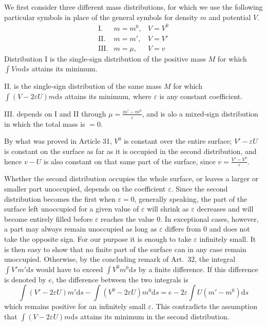 We first consider three different mass distributions, for which we use the following particular symbols in place of the general symbols for density $m$ and potential $V$.
\[
\begin{array}{rll}
\mathrm{I.}&m=m^0,&V=V^0\\
\mathrm{II.}&m=m',&V=V'\\
\mathrm{III.}&m=\mu,&V=v
\end{array}
\]
Distribution I is the single-sign distribution of the positive mass $M$ for which $\int Vm\mathrm ds$ attains its minimum.

II. is the single-sign distribution of the same mass $M$ for which $\int(V-2\varepsilon U)m\mathrm ds$ attains its minimum, where $\varepsilon$ is any constant coefficient.

III. depends on I and II through $\mu=\frac{m'-m^0}{\varepsilon}$, and is alo a mixed-sign distribution in which the total mass is $=0$.

By what was proved in Article 31, $V^0$ is constant over the entire
surface; $V'-\varepsilon U$ is constant on the surface as far as it is occupied in the second distribution, and hence $v-U$ is also constant on that same part of the surface, since $v=\frac{V'-V^0}{\varepsilon}$.

Whether the second distribution occupies the whole surface, or leaves a larger or smaller part unoccupied, depends on the coefficient $\varepsilon$. Since the second distribution becomes the first when $\varepsilon=0$, generally speaking, the part of the surface left unoccupied for a given value of $\varepsilon$ will shrink as $\varepsilon$ decreases and will become entirely filled before $\varepsilon$ reaches the value $0$. In exceptional cases, however, a part may always remain unoccupied as long as $\varepsilon$ differs from $0$ and does not take the opposite sign. For our purpose it is enough to take $\varepsilon$ infinitely small. It is then easy to show that no finite part of the surface can in any case remain unoccupied. Otherwise, by the concluding remark of Art.\ 32, the integral $\int V'm'\mathrm ds$ would have to exceed $\int V^0m^0\mathrm ds$ by a finite difference. If this difference is denoted by $e$, the difference between the two integrals is
\[
\int(V'-2\varepsilon U)m'\mathrm ds-\int(V^0-2\varepsilon U)m^0\mathrm ds=e-2\varepsilon\int U(m'-m^0)\mathrm ds
\]
which remains positive for an infinitely small $\varepsilon$. This contradicts the assumption that $\int(V-2\varepsilon U)m\mathrm ds$ attains its minimum in the second distribution.

